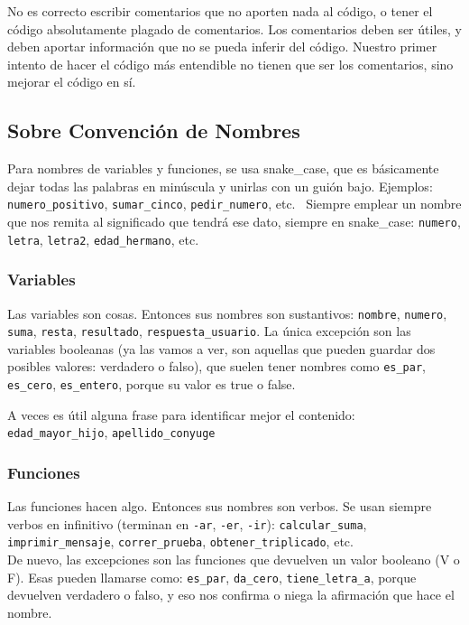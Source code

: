 \documentclass[
  letterpaper,
  DIV=11,
  numbers=noendperiod]{scrreprt}
\begin{document}
No es correcto escribir comentarios que no aporten nada al código, o
tener el código absolutamente plagado de comentarios. Los comentarios
deben ser útiles, y deben aportar información que no se pueda inferir
del código. Nuestro primer intento de hacer el código más entendible no
tienen que ser los comentarios, sino mejorar el código en sí.

\hypertarget{sobre-convenciuxf3n-de-nombres}{%
\subsection{Sobre Convención de
Nombres}\label{sobre-convenciuxf3n-de-nombres}}

Para nombres de variables y funciones, se usa snake\_case, que es
básicamente dejar todas las palabras en minúscula y unirlas con un guión
bajo. Ejemplos: \texttt{numero\_positivo}, \texttt{sumar\_cinco},
\texttt{pedir\_numero}, etc.~ Siempre emplear un nombre que nos remita
al significado que tendrá ese dato, siempre en snake\_case:
\texttt{numero}, \texttt{letra}, \texttt{letra2},
\texttt{edad\_hermano}, etc.

\hypertarget{variables-1}{%
\subsubsection{Variables}\label{variables-1}}

Las variables son cosas. Entonces sus nombres son sustantivos:
\texttt{nombre}, \texttt{numero}, \texttt{suma}, \texttt{resta},
\texttt{resultado}, \texttt{respuesta\_usuario}. La única excepción son
las variables booleanas (ya las vamos a ver, son aquellas que pueden
guardar dos posibles valores: verdadero o falso), que suelen tener
nombres como \texttt{es\_par}, \texttt{es\_cero}, \texttt{es\_entero},
porque su valor es true o false.

A veces es útil alguna frase para identificar mejor el contenido:\\
\texttt{edad\_mayor\_hijo}, \texttt{apellido\_conyuge}

\hypertarget{funciones-1}{%
\subsubsection{Funciones}\label{funciones-1}}

Las funciones hacen algo. Entonces sus nombres son verbos. Se usan
siempre verbos en infinitivo (terminan en \texttt{-ar}, \texttt{-er},
\texttt{-ir}): \texttt{calcular\_suma}, \texttt{imprimir\_mensaje},
\texttt{correr\_prueba}, \texttt{obtener\_triplicado}, etc.\\
De nuevo, las excepciones son las funciones que devuelven un valor
booleano (V o F). Esas pueden llamarse como: \texttt{es\_par},
\texttt{da\_cero}, \texttt{tiene\_letra\_a}, porque devuelven verdadero
o falso, y eso nos confirma o niega la afirmación que hace el nombre.
\end{document}
